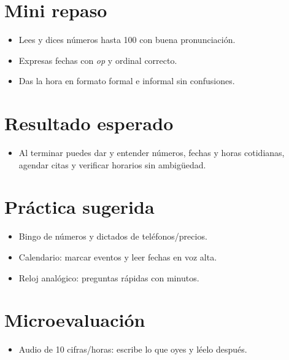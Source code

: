 \section{Mini repaso}
\begin{itemize}[leftmargin=*]
	\item Lees y dices números hasta 100 con buena pronunciación.
	\item Expresas fechas con \textit{op} y ordinal correcto.
	\item Das la hora en formato formal e informal sin confusiones.
\end{itemize}

\section{Resultado esperado}
\begin{itemize}[leftmargin=*]
	\item Al terminar puedes dar y entender números, fechas y horas cotidianas, agendar citas y verificar horarios sin ambigüedad.
\end{itemize}

\section{Práctica sugerida}
\begin{itemize}[leftmargin=*]
	\item Bingo de números y dictados de teléfonos/precios.
	\item Calendario: marcar eventos y leer fechas en voz alta.
	\item Reloj analógico: preguntas rápidas con minutos.
\end{itemize}

\section{Microevaluación}
\begin{itemize}[leftmargin=*]
	\item Audio de 10 cifras/horas: escribe lo que oyes y léelo después.
\end{itemize}
